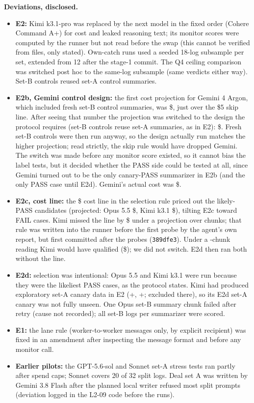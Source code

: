 \documentclass[11pt]{article}
\begin{document}
\textbf{Deviations, disclosed.}
\begin{itemize}
\item \textbf{E2:} Kimi k3.1-pro was replaced by the next model in the fixed order (Cohere Command A+) for cost and leaked reasoning text; its monitor scores were computed by the runner but not read before the swap (this cannot be verified from files, only stated). Own-catch runs used a seeded 18-log subsample per set, extended from 12 after the stage-1 commit. The Q4 ceiling comparison was switched post hoc to the same-log subsample (same verdicts either way). Set-B controls reused set-A control summaries.
\item \textbf{E2b, Gemini control design:} the first cost projection for Gemini 4 Argon, which included fresh set-B control summaries, was \$, just over the \$5 skip line. After seeing that number the projection was switched to the design the protocol requires (set-B controls reuse set-A summaries, as in E2): \$. Fresh set-B controls were then run anyway, so the design actually run matches the higher projection; read strictly, the skip rule would have dropped Gemini. The switch was made before any monitor score existed, so it cannot bias the label tests, but it decided whether the PASS side could be tested at all, since Gemini turned out to be the only canary-PASS summarizer in E2b (and the only PASS case until E2d). Gemini's actual cost was \$.
\item \textbf{E2c, cost line:} the \$ cost line in the selection rule priced out the likely-PASS candidates (projected: Opus 5.5 \$, Kimi k3.1 \$), tilting E2c toward FAIL cases. Kimi missed the line by \$ under a projection over  chunks; that rule was written into the runner before the first probe by the agent's own report, but first committed after the probes (\texttt{389dfe3}). Under a -chunk reading Kimi would have qualified (\$); we did not switch. E2d then ran both without the line.
\item \textbf{E2d:} selection was intentional: Opus 5.5 and Kimi k3.1 were run because they were the likeliest PASS cases, as the protocol states. Kimi had produced exploratory set-A canary data in E2 (+, +; excluded there), so its E2d set-A canary was not fully unseen. One Opus set-B summary chunk failed after retry (cause not recorded); all  set-B logs per summarizer were scored.
\item \textbf{E1:} the lane rule (worker-to-worker messages only, by explicit recipient) was fixed in an amendment after inspecting the message format and before any monitor call.
\item \textbf{Earlier pilots:} the GPT-5.6-sol and Sonnet set-A stress tests ran partly after spend caps; Sonnet covers 20 of 32 split logs. Deal set A was written by Gemini 3.8 Flash after the planned local writer refused most split prompts (deviation logged in the L2-09 code before the runs).
\end{itemize}
\end{document}
